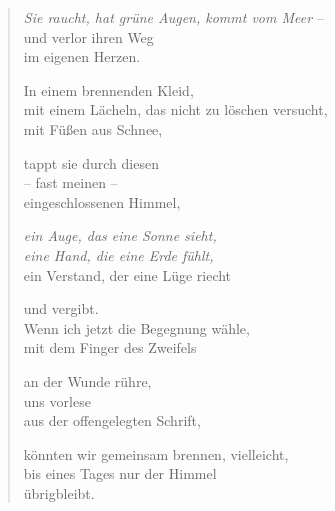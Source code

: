 
\cleartorecto


\begin{verse}

\emph{Sie raucht, hat grüne Augen, kommt vom Meer} --\\
und verlor ihren Weg\\
im eigenen Herzen.

In einem brennenden Kleid,\\
mit einem Lächeln, das nicht zu löschen versucht,\\
mit Füßen aus Schnee,

tappt sie durch diesen\\
-- fast meinen --\\
eingeschlossenen Himmel,

\emph{ein Auge, das eine Sonne sieht,\\
eine Hand, die eine Erde fühlt,}\\
ein Verstand, der eine Lüge riecht

und vergibt.\\
Wenn ich jetzt die Begegnung wähle,\\
mit dem Finger des Zweifels

an der Wunde rühre,\\
uns vorlese\\
aus der offengelegten Schrift,

könnten wir gemeinsam brennen, vielleicht,\\
bis eines Tages nur der Himmel\\
übrigbleibt.

\end{verse}

\cleartoverso


